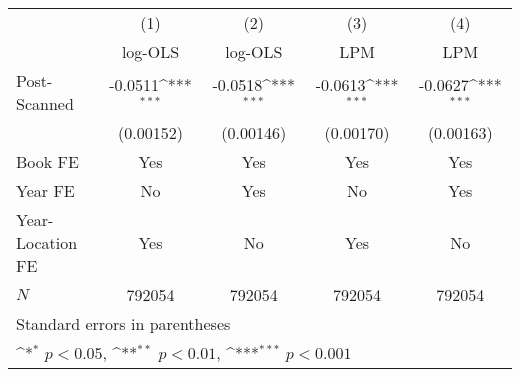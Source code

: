 {
\def\sym#1{\ifmmode^{#1}\else\(^{#1}\)\fi}
\begin{tabular}{l*{4}{c}}
\hline\hline
            &\multicolumn{1}{c}{(1)}&\multicolumn{1}{c}{(2)}&\multicolumn{1}{c}{(3)}&\multicolumn{1}{c}{(4)}\\
            &\multicolumn{1}{c}{log-OLS}&\multicolumn{1}{c}{log-OLS}&\multicolumn{1}{c}{LPM}&\multicolumn{1}{c}{LPM}\\
\hline
Post-Scanned&     -0.0511\sym{***}&     -0.0518\sym{***}&     -0.0613\sym{***}&     -0.0627\sym{***}\\
            &   (0.00152)         &   (0.00146)         &   (0.00170)         &   (0.00163)         \\
\hline
Book FE     &         Yes         &         Yes         &         Yes         &         Yes         \\
Year FE     &          No         &         Yes         &          No         &         Yes         \\
Year-Location FE&         Yes         &          No         &         Yes         &          No         \\
\(N\)       &      792054         &      792054         &      792054         &      792054         \\
\hline\hline
\multicolumn{5}{l}{\footnotesize Standard errors in parentheses}\\
\multicolumn{5}{l}{\footnotesize \sym{*} \(p<0.05\), \sym{**} \(p<0.01\), \sym{***} \(p<0.001\)}\\
\end{tabular}
}
